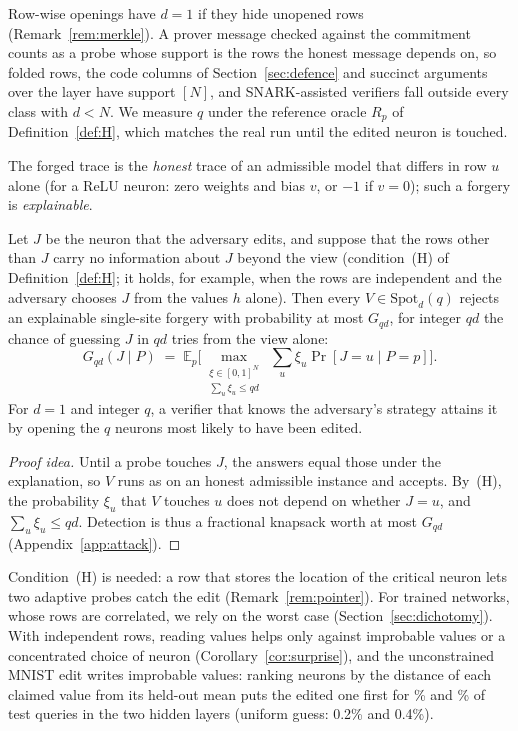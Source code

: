 \noindent Row-wise openings have $d=1$ if they hide unopened rows (Remark~\ref{rem:merkle}). A
prover message checked against the commitment counts as a probe whose support is the rows the
honest message depends on, so folded rows, the code columns of Section~\ref{sec:defence} and
succinct arguments over the layer have support $[N]$, and SNARK-assisted verifiers fall outside
every class with $d<N$. We measure $q$
under the reference oracle $R_p$ of Definition~\ref{def:H}, which matches the real run until the
edited neuron is touched.

 The forged trace is the \emph{honest} trace of an
admissible model that differs in row $u$ alone (for a ReLU neuron: zero weights and bias $v$, or
$-1$ if $v=0$); such a forgery is \emph{explainable}.

\begin{theorem}
\label{thm:guess}
Let $J$ be the neuron that the adversary edits, and suppose that the rows other than $J$ carry no
information about $J$ beyond the view (condition~(H) of Definition~\ref{def:H}; it holds, for
example, when the rows are independent and the adversary chooses $J$ from the values $h$ alone).
Then every $V\in\mathrm{Spot}_d(q)$ rejects an explainable single-site forgery with probability at
most $G_{qd}$, for integer $qd$ the chance of guessing $J$ in $qd$ tries from the view alone:
\[
  G_{qd}(J\mid P) \;=\; \mathbb E_{p}\Big[\max_{\substack{\xi\in[0,1]^N\\ \sum_u\xi_u\le qd}}\ \sum_u\xi_u\Pr[J=u\mid P=p]\Big].
\]
For
$d=1$ and integer $q$, a verifier that knows the adversary's strategy attains it by opening the
$q$ neurons most likely to have been edited.
\end{theorem}

\begin{proof}[Proof idea]
Until a probe touches $J$, the answers equal those under the explanation, so $V$ runs as on an
honest admissible instance and accepts. By~(H), the probability $\xi_u$ that $V$ touches $u$ does
not depend on whether $J=u$, and $\sum_u \xi_u\le qd$. Detection is thus a fractional knapsack worth
at most $G_{qd}$ (Appendix~\ref{app:attack}).
\end{proof}

\noindent Condition~(H) is needed: a row that stores the location of the critical neuron lets two
adaptive probes catch the edit (Remark~\ref{rem:pointer}). For trained networks, whose rows are
correlated, we rely on the worst case (Section~\ref{sec:dichotomy}). With independent rows, reading values helps only
against improbable values or a concentrated choice of neuron (Corollary~\ref{cor:surprise}), and
the unconstrained MNIST edit writes improbable values: ranking neurons by the distance of each
claimed value from its held-out mean puts the edited one first for \LocatorOne{}\% and
\LocatorTwo{}\% of \LocatorQueries{} test queries in the two hidden layers (uniform guess: 0.2\%
and 0.4\%).

